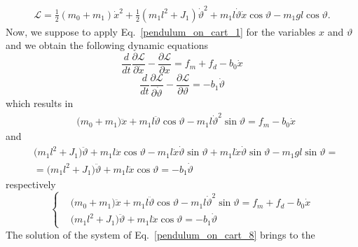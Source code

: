 \documentclass[11pt,a4paper,oneside]{book}
\numberwithin{equation}{section}
\theoremstyle{it}
\theoremstyle{definition}
\begin{document}
\begin{equation}\label{pendulum_on_cart_5}
	\begin{aligned}
		\mathcal{L}=\frac{1}{2}(m_0+m_1)\dot{x}^2+\frac{1}{2}(m_1l^2+J_1)\dot{\vartheta}^2+
		m_1l\dot{\vartheta}\dot{x}\cos\vartheta-m_1gl\cos\vartheta.
	\end{aligned}
\end{equation}
Now, we suppose to apply Eq.~\eqref{pendulum_on_cart_1} for the variables $x$ 
and $\vartheta$ and we obtain the following dynamic equations
\begin{equation}\label{}
	\frac{d}{dt}\frac{\partial \mathcal{L}}{\partial \dot{x}} - 
	\frac{\partial \mathcal{L}}{\partial x} = f_m+f_d-b_0\dot{x}
\end{equation}
\begin{equation}\label{}
	\frac{d}{dt}\frac{\partial \mathcal{L}}{\partial \dot{\vartheta}} - 
	\frac{\partial \mathcal{L}}{\partial \vartheta} = -b_1\dot{\vartheta}
\end{equation}
which results in
\begin{equation}\label{pendulum_on_cart_6}
	\begin{aligned}
		&\Big(m_0+m_1\Big)\ddot{x}+m_1l\ddot{\vartheta}\cos\vartheta - 
		m_1l\dot{\vartheta}^2\sin\vartheta= f_m-b_0\dot{x}
	\end{aligned}
\end{equation}
and 
\begin{equation}\label{pendulum_on_cart_7}
	\begin{aligned}
		&\Big(m_1l^2+J_1\Big)\ddot{\vartheta}+m_1l\ddot{x}\cos\vartheta- 
		m_1l\dot{x}\dot{\vartheta}\sin\vartheta + 
		m_1l\dot{x}\dot{\vartheta}\sin\vartheta
		-m_1gl\sin\vartheta = \\[6pt]
		&=\Big(m_1l^2+J_1\Big)\ddot{\vartheta}+m_1l\ddot{x}\cos\vartheta=-b_1\dot{\vartheta}
	\end{aligned}
\end{equation}
respectively 
\begin{equation}\label{pendulum_on_cart_8}
	\left\lbrace 	\begin{aligned}
		&\Big(m_0+m_1\Big)\ddot{x}+m_1l\ddot{\vartheta}\cos\vartheta - 
		m_1l\dot{\vartheta}^2\sin\vartheta=f_m+f_d -b_0\dot{x} \\[6pt]
		&\Big(m_1l^2+J_1\Big)\ddot{\vartheta}+m_1l\ddot{x}\cos\vartheta=-b_1\dot{\vartheta}
	\end{aligned}\right. 
\end{equation}
The solution of the system of Eq.~\eqref{pendulum_on_cart_8} brings to the 
\end{document}
